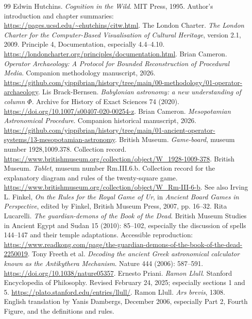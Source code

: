 \documentclass[11pt]{article}
\begin{document}
\begin{thebibliography}{99}
Edwin Hutchins. \emph{Cognition in the Wild}. MIT Press, 1995.
Author's introduction and chapter summaries:
\url{https://pages.ucsd.edu/~ehutchins/citw.html}.
The London Charter. \emph{The London Charter for the Computer-Based
Visualisation of Cultural Heritage}, version 2.1, 2009.
Principle 4, Documentation, especially 4.4--4.10.
\url{https://londoncharter.org/principles/documentation.html}.
Brian Cameron. \emph{Operator Archaeology: A Protocol for Bounded
Reconstruction of Procedural Media}. Companion methodology manuscript, 2026.
\url{https://github.com/yippibrian/history/tree/main/00-methodology/01-operator-archaeology}.
Lis Brack-Bernsen. \emph{Babylonian astronomy: a new understanding of column
$\Phi$}. Archive for History of Exact Sciences 74 (2020).
\url{https://doi.org/10.1007/s00407-020-00254-z}.
Brian Cameron. \emph{Mesopotamian Astronomical Procedure}.
Companion historical manuscript, 2026.
\url{https://github.com/yippibrian/history/tree/main/01-ancient-operator-systems/13-mesopotamian-astronomy}.
British Museum. \emph{Game-board}, museum number 1928,1009.378.
Collection record.
\url{https://www.britishmuseum.org/collection/object/W_1928-1009-378}.
British Museum. \emph{Tablet}, museum number Rm.III.6.b.
Collection record for the explanatory diagram and rules of the twenty-square game.
\url{https://www.britishmuseum.org/collection/object/W_Rm-III-6-b}.
See also Irving L. Finkel, \emph{On the Rules for the Royal Game of Ur}, in
\emph{Ancient Board Games in Perspective}, edited by Finkel, British Museum
Press, 2007, pp. 16--32.
Rita Lucarelli. \emph{The guardian-demons of the Book of the Dead}.
British Museum Studies in Ancient Egypt and Sudan 15 (2010): 85--102,
especially the discussion of spells 144--147 and their temple adaptations.
Accessible reproduction:
\url{https://www.readkong.com/page/the-guardian-demons-of-the-book-of-the-dead-2250019}.
Tony Freeth et al. \emph{Decoding the ancient Greek astronomical calculator known
as the Antikythera Mechanism}. Nature 444 (2006): 587--591.
\url{https://doi.org/10.1038/nature05357}.
Ernesto Priani. \emph{Ramon Llull}. Stanford Encyclopedia of Philosophy.
Revised February 24, 2025; especially sections 1 and 5.
\url{https://plato.stanford.edu/entries/llull/}.
Ramon Llull. \emph{Ars brevis}, 1308. English translation by Yanis Dambergs,
December 2006, especially Part 2, Fourth Figure, and the definitions and rules.

\end{thebibliography}
\end{document}
